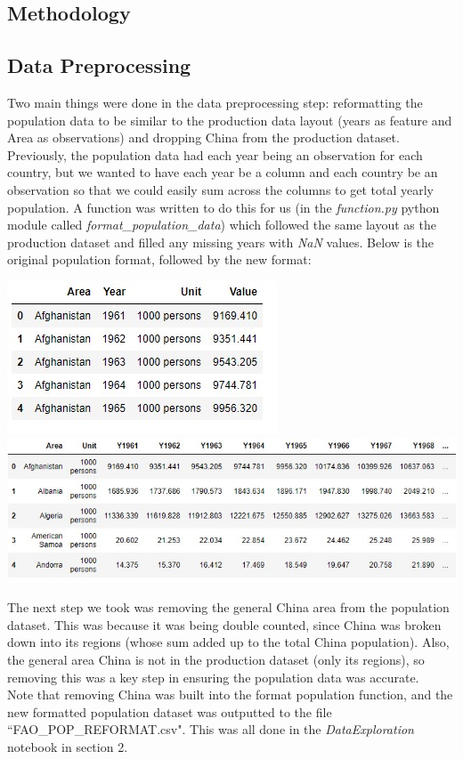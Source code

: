 \documentclass[12pt, a4paper]{article}
\begin{document}
\begin{spacing}{1.1}
	
	\section{Methodology}
	\subsection{Data Preprocessing}
	Two main things were done in the data preprocessing step: reformatting the population data to be similar to the production data layout (years as feature and Area as observations) and dropping China from the production dataset. \vspace*{2mm}\\
	Previously, the population data had each year being an observation for each country, but we wanted to have each year be a column and each country be an observation so that we could easily sum across the columns to get total yearly population. A function was written to do this for us (in the \textit{function.py} python module called \textit{format\_population\_data}) which followed the same layout as the production dataset and filled any missing years with \textit{NaN} values. Below is the original population format, followed by the new format:
	\begin{center}
	\includegraphics[scale=.7]{old_pop} \vspace*{2mm}\\
	\includegraphics[scale=.7]{new_pop}
	\end{center}
	The next step we took was removing the general China area from the population dataset. This was because it was being double counted, since China was broken down into its regions (whose sum added up to the total China population). Also, the general area China is not in the production dataset (only its regions), so removing this was a key step in ensuring the population data was accurate. \vspace*{2mm}\\
	Note that removing China was built into the format population function, and the new formatted population dataset was outputted to the file ``FAO\_POP\_REFORMAT.csv". This was all done in the \textit{DataExploration} notebook in section 2. \newpage
	

\end{spacing}
\end{document}
